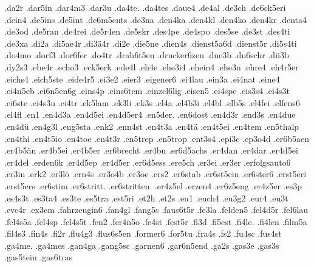 {    .da2r
    .dar5in
    .dar4m3
    .dar3u
    .da4te.
    .da4tes
    .daue4
    .de4al
    .de3ch
    .de6ck5eri
    .dein4
    .de5ins
    .de5int
    .de6m5ents
    .de3na
    .den4ka
    .den4kl
    .den4ko
    .den4kr
    .denta4
    .de3od
    .de5ran
    .de4rei
    .de5r4en
    .de5skr
    .des4pe
    .de4spo
    .des5se
    .de3st
    .des4ti
    .de3xa
    .di2a
    .di5ae4r
    .di3ä4r
    .di2e
    .die5ne
    .dien4s
    .dienst5a6d
    .dienst5r
    .di5s4ti
    .do4mo
    .dorf3
    .dor6fer
    .do4tr
    .drah6t5en
    .drucker6zeu
    .due3b
    .du6schr
    .dü3b
    .dy2s3
    .ebe4r
    .echo3
    .eck5erk
    .ede4l
    .eh4e
    .ehe3i4
    .ehein4
    .ehe3n
    .ehre4
    .eh4r5er
    .eichs4
    .eich5ste
    .eide4r5
    .ei3e2
    .eier3
    .eigener6
    .ei4lau
    .ein3a
    .ei4nat
    .eine4
    .ei4n5eb
    .ei6n5en6g
    .eins4p
    .eins6tem
    .einzel6lig
    .eisen5
    .ei4spe
    .eis3s4
    .ei4s3t
    .ei6ste
    .ei4s3u
    .ei4tr
    .ek5lam
    .ek3li
    .ek3s
    .el4a
    .el4b3i
    .el4bl
    .elb5s
    .el4fei
    .elfens6
    .el4fl
    .en1
    .en4d3a
    .en4d5ei
    .en4d5er4
    .en5der.
    .en6dost
    .en4d3r
    .end3s
    .en4due
    .en4dü
    .en4g3l
    .eng5sta
    .enk2
    .enn4st
    .en4t3a
    .en4tä
    .en4t5ei
    .en4tem
    .en5thalp
    .en4thi
    .en4t5io
    .en4toe
    .en4t3r
    .en5trep
    .en5trop
    .ent3s4
    .epi3c
    .ep3o4d
    .er6b5aen
    .er4b5än
    .er4b5ei
    .er4b5er
    .er6brecht
    .er4bu
    .er6d5achs
    .er4dan
    .er4dar
    .er4d5ei
    .er4del
    .erden6k
    .er4d5ep
    .er4d5er
    .er6d5ess
    .ere5ch
    .er3ei
    .er3er
    .erfolgsauto6
    .er3in
    .erk2
    .er3lö
    .ern4s
    .er3o4b
    .er3oe
    .ers2
    .er6stab
    .er6st5ein
    .er6ster6
    .erst5eri
    .erst5ers
    .er6stim
    .er6stritt.
    .er6stritten.
    .er4z5el
    .erzen4
    .er6z5eng
    .er4z5er
    .es3p
    .es4s3t
    .es3ta4
    .es3te
    .es5tra
    .est5ri
    .et2h
    .et2s
    .eu1
    .euch4
    .eu3g2
    .eur4
    .eu3t
    .eve4r
    .ex3em
    .fahrzeugin6
    .fan4gl
    .fang5s
    .faus6t5r
    .fe3la
    .felden5
    .fel4d5r
    .fel6lau
    .fel4s5a
    .fel4sp
    .fel4s5t
    .fen2
    .fer4n5o
    .fe4st
    .fest5r
    .fi3d
    .fi5est
    .fi4le.
    .fi4len
    .film5a
    .fil4s3
    .fin4s
    .fi2r
    .flu4g3
    .flus6s5en
    .former6
    .for5tu
    .fra4s
    .fs2
    .fu4sc
    .fus4st
    .ga4me.
    .ga4mes
    .gan4ga
    .gang5sc
    .garnen6
    .gar6n5end
    .ga2s
    .gas3e
    .gas3s
    .gas5tein
    .gas6tras
}
